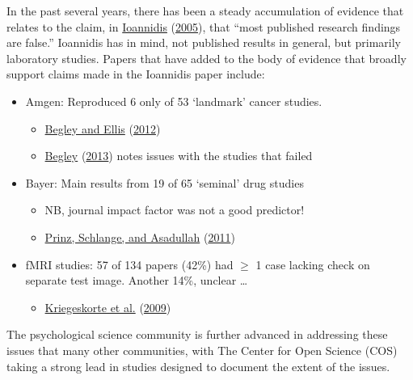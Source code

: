 \documentclass[
  10pt,
  b5paper]{book}
\providecommand{\tightlist}{%
  \setlength{\itemsep}{0pt}\setlength{\parskip}{0pt}}
\begin{document}
In the past several years, there has been a steady accumulation
of evidence that relates to the claim, in \protect\hyperlink{ref-r19_ioannidis_2005}{Ioannidis} (\protect\hyperlink{ref-r19_ioannidis_2005}{2005}),
that ``most published research findings are false.'' Ioannidis
has in mind, not published results in general, but primarily
laboratory studies. Papers that have added to the
body of evidence that broadly support claims made in the
Ioannidis paper include:

\begin{itemize}
\tightlist
\item
  Amgen: Reproduced 6 only of 53 `landmark' cancer studies.

  \begin{itemize}
  \tightlist
  \item
    \protect\hyperlink{ref-r23_begley_ellis_2012}{Begley and Ellis} (\protect\hyperlink{ref-r23_begley_ellis_2012}{2012})
  \item
    \protect\hyperlink{ref-r2_begley_2013}{Begley} (\protect\hyperlink{ref-r2_begley_2013}{2013}) notes issues with the studies that failed
  \end{itemize}
\item
  Bayer: Main results from 19 of 65 `seminal' drug studies

  \begin{itemize}
  \tightlist
  \item
    NB, journal impact factor was not a good predictor!
  \item
    \protect\hyperlink{ref-r9_prinz_schlange_asadullah_2011}{Prinz, Schlange, and Asadullah} (\protect\hyperlink{ref-r9_prinz_schlange_asadullah_2011}{2011})
  \end{itemize}
\item
  fMRI studies: 57 of 134 papers (42\%) had \(\geq\) 1 case lacking
  check on separate test image.
  Another 14\%, unclear \ldots{}

  \begin{itemize}
  \tightlist
  \item
    \protect\hyperlink{ref-r8_kriegeskorte_simmons_bellgowan_baker_2009}{Kriegeskorte et al.} (\protect\hyperlink{ref-r8_kriegeskorte_simmons_bellgowan_baker_2009}{2009})
  \end{itemize}
\end{itemize}

\enlargethispage{12pt}

The psychological science community is further advanced in
addressing these issues that many other communities, with
The Center for Open Science (COS) taking a strong lead in
studies designed to document the extent of the issues.
\end{document}
